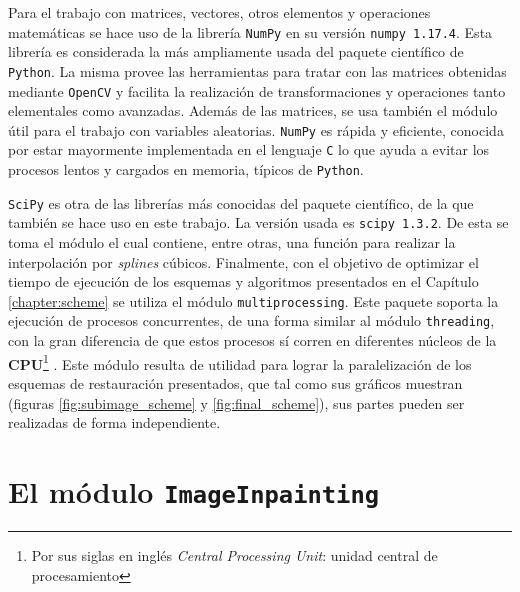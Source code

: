 Para el trabajo con matrices, vectores, otros elementos y operaciones matem\'aticas se hace uso de la librer\'ia \texttt{NumPy} en su versi\'on \texttt{numpy 1.17.4}. Esta librer\'ia es considerada la m\'as ampliamente usada del paquete científico de \texttt{Python}. La misma provee las herramientas para tratar con las matrices obtenidas mediante \texttt{OpenCV} y facilita la realización de transformaciones y operaciones tanto elementales como avanzadas. Adem\'as de las matrices, se usa tambi\'en el m\'odulo  \'util para el trabajo con variables aleatorias. \texttt{NumPy} es r\'apida y eficiente, conocida por estar mayormente implementada en el lenguaje \texttt{C} lo que ayuda a evitar los procesos lentos y cargados en memoria, t\'ipicos de \texttt{Python}.

\texttt{SciPy} es otra de las librer\'ias m\'as conocidas del paquete científico, de la que tambi\'en se hace uso en este trabajo. La versión usada es \texttt{scipy 1.3.2}. De esta se toma el m\'odulo  el cual contiene, entre otras, una funci\'on para realizar la interpolaci\'on por \textit{splines} c\'ubicos. Finalmente, con el objetivo de optimizar el tiempo de ejecuci\'on de los esquemas y algoritmos presentados en el Cap\'itulo \ref{chapter:scheme} se utiliza el m\'odulo \texttt{multiprocessing}. Este paquete soporta la ejecuci\'on de procesos concurrentes, de una forma similar al m\'odulo \texttt{threading}, con la gran diferencia de que estos procesos s\'i corren en diferentes n\'ucleos de la \textbf{CPU}\footnote{Por sus siglas en ingl\'es \textit{Central Processing Unit}: unidad central de procesamiento} \cite{enwiki:cpu}. Este m\'odulo resulta de utilidad para lograr la paralelizaci\'on de los esquemas de restauraci\'on presentados, que tal como sus gr\'aficos muestran (figuras \ref{fig:subimage_scheme} y \ref{fig:final_scheme}), sus partes pueden ser realizadas de forma independiente.

\section{El m\'odulo \texttt{ImageInpainting}}\label{sec:imageinpainting_module}

